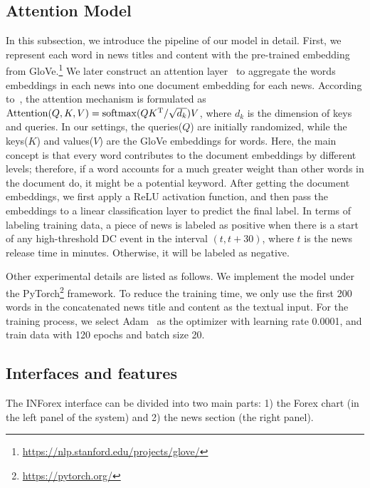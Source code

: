 \documentclass[runningheads]{llncs}
\begin{document}
\subsection{Attention Model}
\vspace{-0.3cm}
In this subsection, we introduce the pipeline of our model in detail. First, we represent each word in news titles and content with the pre-trained embedding from GloVe.\footnote{\url{https://nlp.stanford.edu/projects/glove/}}
We later construct an attention layer~\cite{attention}
to aggregate the words embeddings in each news into one document embedding for each news.
According to~\cite{attention}, the attention mechanism is formulated as ${\rm Attention}(Q, K, V) = {\rm softmax}(QK\textsuperscript{T}/\sqrt{d_k})V$, where $d_k$ is the dimension of keys and queries. In our settings, the queries($Q$) are initially randomized, while the keys($K$) and values($V$) are the GloVe embeddings for words. Here, the main concept is that every word contributes to the document embeddings by different levels; therefore, if a word accounts for a much greater weight than other words in the document do, it might be a potential keyword. After getting the document embeddings, we first apply a ReLU activation function, and then pass the embeddings to a linear classification layer to predict the final label. In terms of labeling training data, a piece of news is labeled as positive when there is a start of any high-threshold DC event in the interval ${(t, t+30)}$, where $t$ is the news release time in minutes. Otherwise, it will be labeled as negative.

Other experimental details are listed as follows.
We implement the model under the PyTorch\footnote{\url{https://pytorch.org/}} framework. To reduce the training time, we only use the first 200 words in the concatenated news title and content as the textual input. For the training process, we select Adam~\cite{Adam} as the optimizer with learning rate 0.0001, and train data with 120 epochs and batch size 20.
\vspace{-0.5cm}
\subsection{Interfaces and features}
\vspace{-0.3cm}
The INForex interface can be divided into two main parts: 1) the Forex chart
(in the left panel of the system) and 2) the news section (the right panel).

\vspace{-0.2cm}
\end{document}
